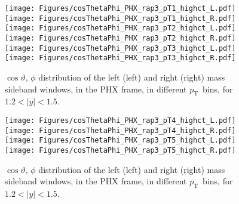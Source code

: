 \documentclass[12pt]{article}
\newcommand{\pt}{$p_{\mathrm{T}}$}
\begin{document}
\begin{figure}[htbp]
\centering
\texttt{[image: Figures/cosThetaPhi\_PHX\_rap3\_pT1\_highct\_L.pdf]}
\texttt{[image: Figures/cosThetaPhi\_PHX\_rap3\_pT1\_highct\_R.pdf]}
\texttt{[image: Figures/cosThetaPhi\_PHX\_rap3\_pT2\_highct\_L.pdf]}
\texttt{[image: Figures/cosThetaPhi\_PHX\_rap3\_pT2\_highct\_R.pdf]}
\texttt{[image: Figures/cosThetaPhi\_PHX\_rap3\_pT3\_highct\_L.pdf]}
\texttt{[image: Figures/cosThetaPhi\_PHX\_rap3\_pT3\_highct\_R.pdf]}
\caption{$\cos\vartheta,\,\phi$ distribution of the left (left) and
  right (right) mass sideband windows, in the PHX frame, in different
  \pt\ bins, for $1.2 < |y| < 1.5$.}
\end{figure}
\clearpage

\begin{figure}[htbp]
\centering
\texttt{[image: Figures/cosThetaPhi\_PHX\_rap3\_pT4\_highct\_L.pdf]}
\texttt{[image: Figures/cosThetaPhi\_PHX\_rap3\_pT4\_highct\_R.pdf]}
\texttt{[image: Figures/cosThetaPhi\_PHX\_rap3\_pT5\_highct\_L.pdf]}
\texttt{[image: Figures/cosThetaPhi\_PHX\_rap3\_pT5\_highct\_R.pdf]}
\caption{$\cos\vartheta,\,\phi$ distribution of the left (left) and
  right (right) mass sideband windows, in the PHX frame, in different
  \pt\ bins, for $1.2 < |y| < 1.5$.} 
\end{figure}
\clearpage
\end{document}
